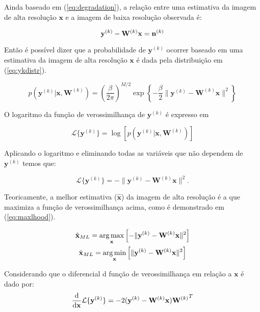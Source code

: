 Ainda baseado em (\ref{eq:degradation}), a relação entre uma estimativa da imagem de alta resolução $\mathbf{x}$ e a imagem de baixa resolução observada é:

\begin{equation}
	\mathbf{y}^{(k)} - \mathbf{W}^{(k)} \mathbf{x} =  \mathbf{n}^{(k)} \\
\end{equation}

Então é possível dizer que a probabilidade de $\mathbf{y}^{(k)}$ ocorrer baseado em uma estimativa da imagem de alta resolução $\mathbf{x}$ é dada pela distribuição em (\ref{eq:ykdistr}).

\begin{equation}
	\label{eq:ykdistr}
	p(\mathbf{y}^{(k)} | \mathbf{x}, \mathbf{W}^{(k)}) = \left(\frac{ \beta}{2\pi} \right)^{M/2}
	\exp{\left\{-\frac{\beta}{2}\|\mathbf{y}^{(k)} - \mathbf{W}^{(k)}\mathbf{x} \|^2 \right\}}
\end{equation}

O logaritmo da função de verossimilhança de $\mathbf{y}^{(k)}$ é expresso em

\begin{equation}
	\mathcal{L}\{\mathbf{y}^{(k)}\} = \log \left[ p(\mathbf{y}^{(k)} | \mathbf{x}, \mathbf{W}^{(k)}) \right]
\end{equation}

Aplicando o logaritmo e eliminando todas as variáveis que não dependem de $\mathbf{y}^{(k)}$ temos que:

\begin{equation}
	\mathcal{L}\{\mathbf{y}^{(k)}\} = -\|\mathbf{y}^{(k)} - \mathbf{W}^{(k)}\mathbf{x}\|^2.
\end{equation}

Teoricamente, a melhor estimativa ($\hat{\mathbf{x}}$) da imagem de alta resolução é a
que maximiza a função de verossimilhança acima, como é demonstrado em (\ref{eq:maxlhood}).

\begin{gather}
	\label{eq:maxlhood}
	\hat{\mathbf{x}}_{ML} = \operatorname*{arg\,max}_{\mathbf{x}}
	\left[ - \|\mathbf{y}^{(k)} - \mathbf{W}^{(k)}\mathbf{x}\|^2 
	\right ] \\
	\hat{\mathbf{x}}_{ML} = \operatorname*{arg\,min}_{\mathbf{x}}
	\left[ \|\mathbf{y}^{(k)} - \mathbf{W}^{(k)}\mathbf{x}\|^2 
	\right ] 
\end{gather}


Considerando que o diferencial d função de verossimilhança em relação a $\mathbf{x}$ é dado por:
\begin{equation}
	\frac{\mathrm{d}}{\mathrm{d} \mathbf{x}}
	\mathcal{L}\{\mathbf{y}^{(k)}\} = -2 (\mathbf{y}^{(k)} - \mathbf{W}^{(k)}\mathbf{x}) {\mathbf{W}^{(k)}}^T \\
\end{equation}

